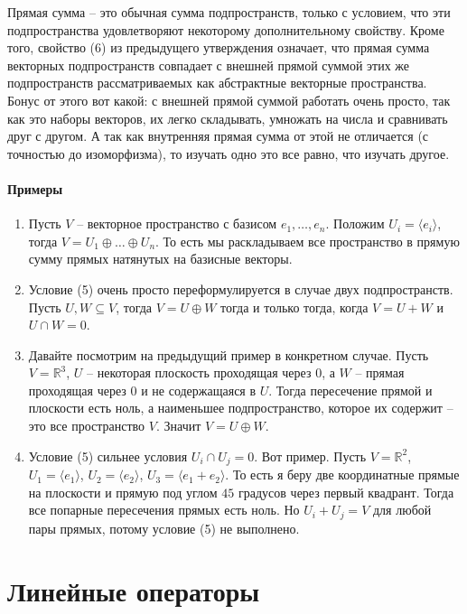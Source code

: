 Прямая сумма -- это обычная сумма подпространств, только с условием, что эти подпространства удовлетворяют некоторому дополнительному свойству.
Кроме того, свойство (6) из предыдущего утверждения означает, что прямая сумма векторных подпространств совпадает с внешней прямой суммой этих же подпространств рассматриваемых как абстрактные векторные пространства.
Бонус от этого вот какой: с внешней прямой суммой работать очень просто, так как это наборы векторов, их легко складывать, умножать на числа и сравнивать друг с другом.
А так как внутренняя прямая сумма от этой не отличается (с точностью до изоморфизма), то изучать одно это все равно, что изучать другое.

\paragraph{Примеры}

\begin{enumerate}
\item Пусть $V$ -- векторное пространство с базисом $e_1,\ldots,e_n$.
Положим $U_i = \langle e_i \rangle$, тогда $V = U_1 \oplus \ldots \oplus U_n$.
То есть мы раскладываем все пространство в прямую сумму прямых натянутых на базисные векторы.

\item Условие (5) очень просто переформулируется в случае двух подпространств.
Пусть $U, W\subseteq V$, тогда $V = U \oplus W$ тогда и только тогда, когда $V = U + W$ и $U \cap W = 0$.

\item Давайте посмотрим на предыдущий пример в конкретном случае.
Пусть $V=\mathbb R^3$, $U$ -- некоторая плоскость проходящая через $0$, а $W$ -- прямая проходящая через $0$ и не содержащаяся в $U$.
Тогда пересечение прямой и плоскости есть ноль, а наименьшее подпространство, которое их содержит -- это все пространство $V$.
Значит $V = U \oplus W$.

\item Условие (5) сильнее условия $U_i \cap U_j = 0$.
Вот пример.
Пусть $V = \mathbb R^2$, $U_1 = \langle e_1\rangle$, $U_2 = \langle e_2\rangle$, $U_3 = \langle e_1 + e_2\rangle$.
То есть я беру две координатные прямые на плоскости и прямую под углом $45$ градусов через первый квадрант.
Тогда все попарные пересечения прямых есть ноль.
Но $U_i + U_j = V$ для любой пары прямых, потому условие (5) не выполнено.
\end{enumerate}

\newpage
\section{Линейные операторы}

